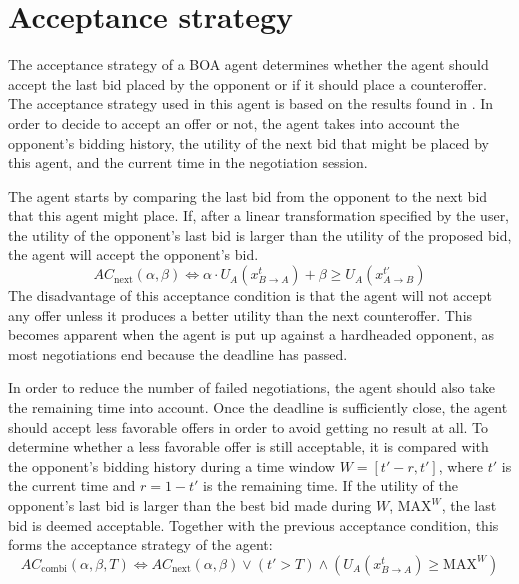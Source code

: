 \section{Acceptance strategy}

The acceptance strategy of a BOA agent determines whether the agent should accept the last bid placed by the opponent or if it should place a counteroffer.
The acceptance strategy used in this agent is based on the results found in \cite{ASarticle}.
In order to decide to accept an offer or not, the agent takes into account the opponent's bidding history, the utility of the next bid that might be placed by this agent, and the current time in the negotiation session.

The agent starts by comparing the last bid from the opponent to the next bid that this agent might place.
If, after a linear transformation specified by the user, the utility of the opponent's last bid is larger than the utility of the proposed bid, the agent will accept the opponent's bid.
$$
AC_\mathrm{next}(\alpha,\beta) \Leftrightarrow \alpha \cdot U_A(x^t_{B\rightarrow A}) + \beta \geq U_A(x^{t'}_{A\rightarrow B})
$$
The disadvantage of this acceptance condition is that the agent will not accept any offer unless it produces a better utility than the next counteroffer.
This becomes apparent when the agent is put up against a hardheaded opponent, as most negotiations end because the deadline has passed.

In order to reduce the number of failed negotiations, the agent should also take the remaining time into account.
Once the deadline is sufficiently close, the agent should accept less favorable offers in order to avoid getting no result at all.
To determine whether a less favorable offer is still acceptable, it is compared with the opponent's bidding history during a time window $W=[t'-r, t']$, where $t'$ is the current time and $r=1-t'$ is the remaining time.
If the utility of the opponent's last bid is larger than the best bid made during $W$, $\mathrm{MAX}^W$, the last bid is deemed acceptable.
Together with the previous acceptance condition, this forms the acceptance strategy of the agent:
$$
AC_\mathrm{combi}(\alpha,\beta,T) \Leftrightarrow AC_\mathrm{next}(\alpha,\beta) \vee (t' > T) \wedge ( U_A(x^t_{B\rightarrow A}) \geq \mathrm{MAX}^W)
$$
